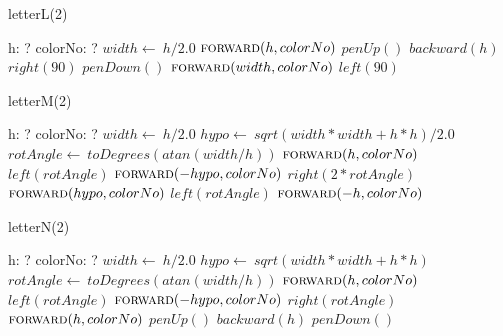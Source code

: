 \documentclass[a4paper,10pt]{article}
\begin{document}
\begin{algorithm}
\caption{letterL(2)}
\begin{algorithmic}[5]
\State {}
\State {}
    \State h: ?
    \State colorNo: ?
  \EndDecl
  \State \(width\gets\ h/2.0\)
  \State \(\Call{forward}{h,colorNo}\)
  \State \(penUp()\)
  \State \(backward(h)\)
  \State \(right(90)\)
  \State \(penDown()\)
  \State \(\Call{forward}{width,colorNo}\)
  \State \(left(90)\)
\EndProcedure
\end{algorithmic}
\end{algorithm}


\begin{algorithm}
\caption{letterM(2)}
\begin{algorithmic}[5]
\State {}
\State {}
    \State h: ?
    \State colorNo: ?
  \EndDecl
  \State \(width\gets\ h/2.0\)
  \State \(hypo\gets\ sqrt(width*width+h*h)/2.0\)
  \State \(rotAngle\gets\ toDegrees(atan(width/h))\)
  \State \(\Call{forward}{h,colorNo}\)
  \State \(left(rotAngle)\)
  \State \(\Call{forward}{-hypo,colorNo}\)
  \State \(right(2*rotAngle)\)
  \State \(\Call{forward}{hypo,colorNo}\)
  \State \(left(rotAngle)\)
  \State \(\Call{forward}{-h,colorNo}\)
\EndProcedure
\end{algorithmic}
\end{algorithm}


\begin{algorithm}
\caption{letterN(2)}
\begin{algorithmic}[5]
\State {}
\State {}
    \State h: ?
    \State colorNo: ?
  \EndDecl
  \State \(width\gets\ h/2.0\)
  \State \(hypo\gets\ sqrt(width*width+h*h)\)
  \State \(rotAngle\gets\ toDegrees(atan(width/h))\)
  \State \(\Call{forward}{h,colorNo}\)
  \State \(left(rotAngle)\)
  \State \(\Call{forward}{-hypo,colorNo}\)
  \State \(right(rotAngle)\)
  \State \(\Call{forward}{h,colorNo}\)
  \State \(penUp()\)
  \State \(backward(h)\)
  \State \(penDown()\)
\EndProcedure
\end{algorithmic}
\end{algorithm}
\end{document}
